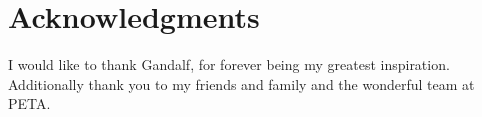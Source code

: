 \documentclass[../main.tex]{subfiles}
\begin{document}
\section*{Acknowledgments}

I would like to thank Gandalf, for forever being my greatest inspiration. Additionally thank you to my friends and family and the wonderful team at PETA.
\end{document}
